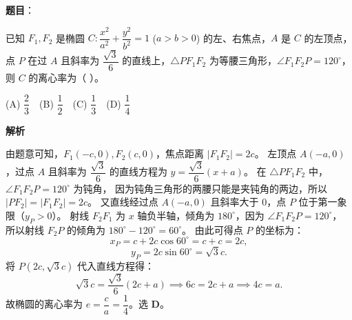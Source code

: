 \begin{answer}

\textbf{题目}：

已知 $F_1, F_2$ 是椭圆 $C: \dfrac{x^2}{a^2}+\dfrac{y^2}{b^2}=1$ ($a>b>0$) 的左、右焦点，$A$ 是 $C$ 的左顶点，点 $P$ 在过 $A$ 且斜率为 $\dfrac{\sqrt3}{6}$ 的直线上，$\triangle PF_1F_2$ 为等腰三角形，$\angle F_1F_2P = 120^\circ$，则 $C$ 的离心率为（ ）。

(A) $\dfrac23$　(B) $\dfrac12$　(C) $\dfrac13$　(D) $\dfrac14$

\textbf{解析}

由题意可知，$F_1(-c,0), F_2(c,0)$，焦点距离 $|F_1F_2| = 2c$。
左顶点 $A(-a,0)$，过点 $A$ 且斜率为 $\dfrac{\sqrt3}{6}$ 的直线方程为 $y = \dfrac{\sqrt3}{6}(x+a)$。
在 $\triangle PF_1F_2$ 中，$\angle F_1F_2P = 120^\circ$ 为钝角，
因为钝角三角形的两腰只能是夹钝角的两边，所以 $|PF_2| = |F_1F_2| = 2c$。
又直线经过点 $A(-a,0)$ 且斜率大于 0，点 $P$ 位于第一象限（$y_P>0$）。
射线 $F_2F_1$ 为 $x$ 轴负半轴，倾角为 $180^\circ$，因为 $\angle F_1F_2P = 120^\circ$，
所以射线 $F_2P$ 的倾角为 $180^\circ - 120^\circ = 60^\circ$。
由此可得点 $P$ 的坐标为：
\nopagebreak[4]
\[x_P = c + 2c\cos 60^\circ = c + c = 2c,\]
\nopagebreak[4]
\[y_P = 2c\sin 60^\circ = \sqrt3 c.\]
将 $P(2c, \sqrt3 c)$ 代入直线方程得：
\nopagebreak[4]
\[\sqrt3 c = \dfrac{\sqrt3}{6}(2c+a) \implies 6c = 2c+a \implies 4c = a.\]
故椭圆的离心率为 $e = \dfrac ca = \dfrac14$。选 \textbf{D}。


\par\medskip

\end{answer}

